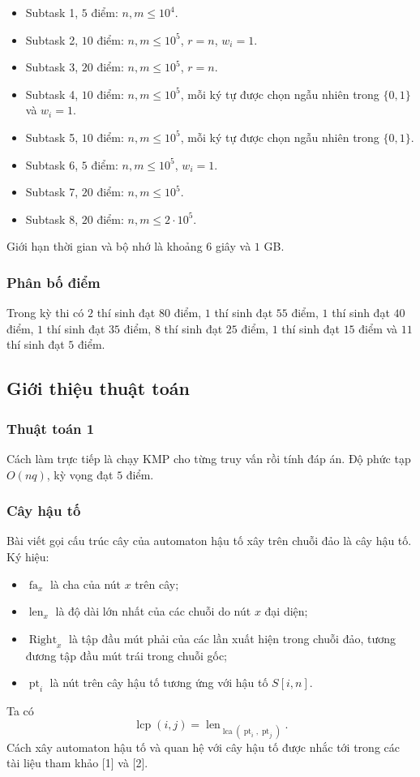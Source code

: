 \documentclass[11pt]{article}
\begin{document}
\begin{itemize}
  \item Subtask 1, $5$ điểm: $n,m\le 10^4$.
  \item Subtask 2, $10$ điểm: $n,m\le 10^5$, $r=n$, $w_i=1$.
  \item Subtask 3, $20$ điểm: $n,m\le 10^5$, $r=n$.
  \item Subtask 4, $10$ điểm: $n,m\le 10^5$, mỗi ký tự được chọn ngẫu nhiên trong
  $\{0,1\}$ và $w_i=1$.
  \item Subtask 5, $10$ điểm: $n,m\le 10^5$, mỗi ký tự được chọn ngẫu nhiên trong
  $\{0,1\}$.
  \item Subtask 6, $5$ điểm: $n,m\le 10^5$, $w_i=1$.
  \item Subtask 7, $20$ điểm: $n,m\le 10^5$.
  \item Subtask 8, $20$ điểm: $n,m\le 2\cdot 10^5$.
\end{itemize}
Giới hạn thời gian và bộ nhớ là khoảng $6$ giây và $1$ GB.

\subsubsection{Phân bố điểm}

Trong kỳ thi có $2$ thí sinh đạt $80$ điểm, $1$ thí sinh đạt $55$ điểm, $1$ thí
sinh đạt $40$ điểm, $1$ thí sinh đạt $35$ điểm, $8$ thí sinh đạt $25$ điểm, $1$
thí sinh đạt $15$ điểm và $11$ thí sinh đạt $5$ điểm.

\subsection{Giới thiệu thuật toán}

\subsubsection{Thuật toán 1}

Cách làm trực tiếp là chạy KMP cho từng truy vấn rồi tính đáp án. Độ phức tạp
$O(nq)$, kỳ vọng đạt $5$ điểm.

\subsubsection{Cây hậu tố}

Bài viết gọi cấu trúc cây của automaton hậu tố xây trên chuỗi đảo là cây hậu tố.
Ký hiệu:
\begin{itemize}
  \item $\operatorname{fa}_x$ là cha của nút $x$ trên cây;
  \item $\operatorname{len}_x$ là độ dài lớn nhất của các chuỗi do nút $x$ đại
  diện;
  \item $\operatorname{Right}_x$ là tập đầu mút phải của các lần xuất hiện trong
  chuỗi đảo, tương đương tập đầu mút trái trong chuỗi gốc;
  \item $\operatorname{pt}_i$ là nút trên cây hậu tố tương ứng với hậu tố
  $S[i,n]$.
\end{itemize}
Ta có
\[
  \operatorname{lcp}(i,j)=
  \operatorname{len}_{\operatorname{lca}(\operatorname{pt}_i,\operatorname{pt}_j)}.
\]
Cách xây automaton hậu tố và quan hệ với cây hậu tố được nhắc tới trong các tài
liệu tham khảo [1] và [2].
\end{document}
